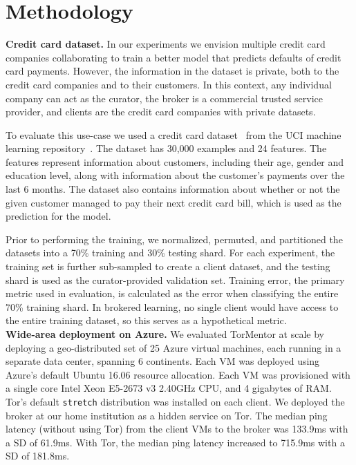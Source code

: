 \section{Methodology}
\label{eval:method}

\textbf{Credit card dataset.} In our experiments we envision multiple
credit card companies collaborating to train a better model that
predicts defaults of credit card payments. However, the information in
the dataset is private, both to the credit card companies and to their
customers. In this context, any individual company can act as the
curator, the broker is a commercial trusted service provider, and
clients are the credit card companies with private datasets.

To evaluate this use-case we used a credit card
dataset~\cite{Yeh:2009} from the \ac{UCI} machine learning
repository~\cite{Lichman:2013}. The dataset has 30,000 examples and
24 features. The features represent information about customers,
including their age, gender and education level, along with
information about the customer's payments over the last 6 months. The
dataset also contains information about whether or not the given
customer managed to pay their next credit card bill, which is used as
the prediction for the model.
 
Prior to performing the training, we normalized, permuted, and
partitioned the datasets into a 70\% training and 30\% testing shard.
For each experiment, the training set is further sub-sampled to create
a client dataset, and the testing shard is used as the
curator-provided validation set. Training error, the primary metric
used in evaluation, is calculated as the error when classifying the
entire 70\% training shard. In brokered learning, no single client
would have access to the entire training dataset, so this serves as a
hypothetical metric. \\

\noindent \textbf{Wide-area deployment on Azure.}  
We evaluated TorMentor at scale by deploying a geo-distributed set of
25 Azure virtual machines, each running in a separate data center, spanning 6
continents. Each \ac{VM} was deployed using Azure's
default Ubuntu 16.06 resource allocation. Each \ac{VM} was provisioned with
a single core Intel Xeon E5-2673 v3 2.40GHz \ac{CPU}, and 4 gigabytes of \ac{RAM}.
Tor's default \texttt{stretch} distribution was installed on each client.
We deployed the broker at our home institution as a hidden service on
Tor. The median ping latency (without using Tor) from the client
VMs to the broker was 133.9ms with a \ac{SD} of 61.9ms.
With Tor, the median ping latency increased to 715.9ms with a \ac{SD} of
181.8ms.

